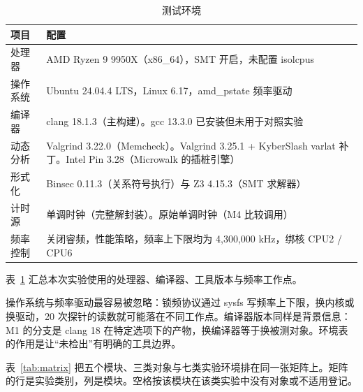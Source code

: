 \begin{table}[H]
\centering
\caption{测试环境}
\label{tab:env}
{\small
\begin{tabularx}{\textwidth}{|>{\raggedright\arraybackslash}p{2.3cm}|>{\raggedright\arraybackslash}X|}
\hline
项目 & 配置 \\
\hline
处理器 & AMD Ryzen 9 9950X（x86\_64），SMT 开启，未配置 isolcpus \\
\hline
操作系统 & Ubuntu 24.04.4 LTS，Linux 6.17，amd\_pstate 频率驱动 \\
\hline
编译器 & clang 18.1.3（主构建）。gcc 13.3.0 已安装但未用于对照实验 \\
\hline
动态分析 & Valgrind 3.22.0（Memcheck）。Valgrind 3.25.1 + KyberSlash varlat 补丁。Intel Pin 3.28（Microwalk 的插桩引擎） \\
\hline
形式化 & Binsec 0.11.3（关系符号执行）与 Z3 4.15.3（SMT 求解器） \\
\hline
计时源 & 单调时钟（完整解封装）。原始单调时钟（M4 比较调用） \\
\hline
频率控制 & 关闭睿频，性能策略，频率上下限均为 4,300,000 kHz，绑核 CPU2 / CPU6 \\
\hline
\end{tabularx}
}
\end{table}

表~\ref{tab:env} 汇总本次实验使用的处理器、编译器、工具版本与频率工作点。

操作系统与频率驱动最容易被忽略：锁频协议通过 sysfs 写频率上下限，换内核或换驱动，20 次探针的读数就可能落在不同工作点。编译器版本同样是背景信息：M1 的分支是 clang 18 在特定选项下的产物，换编译器等于换被测对象。环境表的作用是让“未检出”有明确的工具边界。

表~\ref{tab:matrix} 把五个模块、三类对象与七类实验环境排在同一张矩阵上。矩阵的行是实验类别，列是模块。空格按该模块在该类实验中没有对象或不适用登记。

